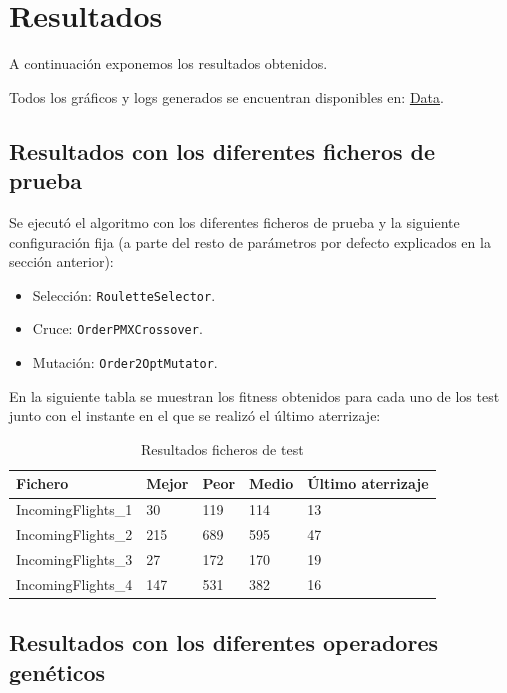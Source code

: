 \documentclass[a4paper,12pt,titlepage]{article}
\begin{document}
\section{Resultados}

A continuación exponemos los resultados obtenidos.

Todos los gráficos y logs generados se encuentran disponibles en: \href{https://github.com/davidmigloz/evolutionary-computation/tree/master/P1\_AirTafficController/data}{Data}.

\subsection{Resultados con los diferentes ficheros de prueba}

Se ejecutó el algoritmo con los diferentes ficheros de prueba y la siguiente configuración fija (a parte del resto de parámetros por defecto explicados en la sección anterior):

\begin{itemize}[noitemsep]
	\item Selección: \lstinline|RouletteSelector|.
	\item Cruce: \lstinline|OrderPMXCrossover|.
	\item Mutación: \lstinline|Order2OptMutator|.	
\end{itemize}

En la siguiente tabla se muestran los fitness obtenidos para cada uno de los test junto con el instante en el que se realizó el último aterrizaje:

\newpage

\begin{table}[!ht]
\centering
\begin{tabular}{@{}lllll@{}}
\toprule
Fichero            & Mejor & Peor & Medio & Último aterrizaje \\ \midrule
IncomingFlights\_1 & 30    & 119  & 114   & 13                \\
IncomingFlights\_2 & 215   & 689  & 595   & 47                \\
IncomingFlights\_3 & 27    & 172  & 170   & 19                \\
IncomingFlights\_4 & 147   & 531  & 382   & 16                \\ \bottomrule
\end{tabular}
\caption{Resultados ficheros de test}
\end{table}

\subsection{Resultados con los diferentes operadores genéticos}
\end{document}

